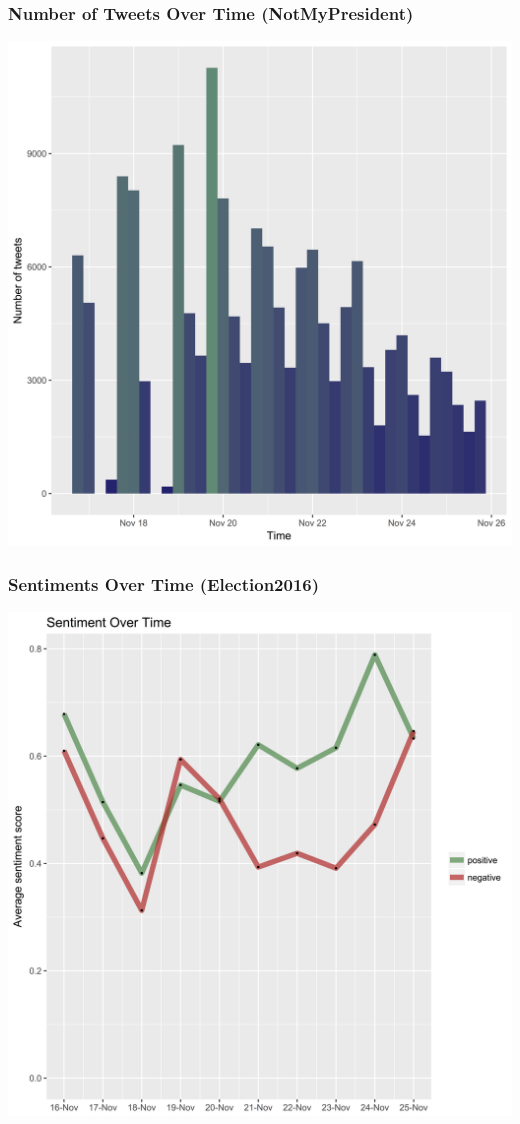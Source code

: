 \documentclass{beamer}
\begin{document}
\begin{frame}
	\frametitle{Number of Tweets Over Time (NotMyPresident)}
  \includegraphics[height = 0.9\textheight]{nmpfreq}
\end{frame}

\begin{frame}
	\frametitle{Sentiments Over Time (Election2016)}
  \includegraphics[height = 0.9\textheight]{e2016sentiments}
\end{frame}
\end{document}
